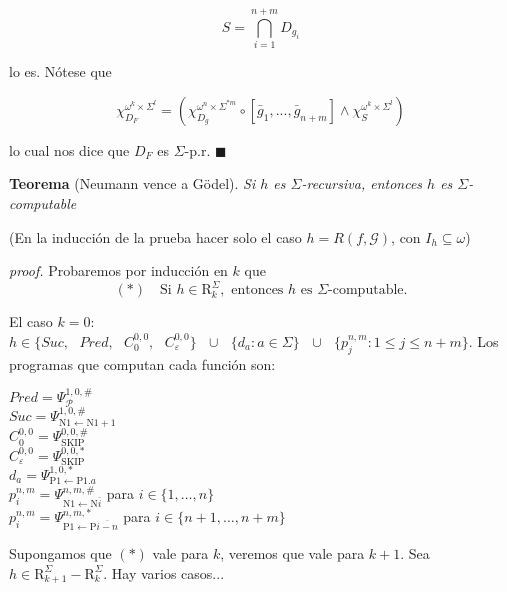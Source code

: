 \documentclass{article}
\begin{document}
\[
S = \bigcap_{i=1}^{n+m} D_{g_i}
\]

lo es. Nótese que

\[
\chi_{D_F}^{\omega^k \times \Sigma^l} = \left( \chi_{D_g}^{\omega^n \times \Sigma^{*m}} \circ [\bar{g}_1, ..., \bar{g}_{n+m}]  \land \chi_S^{\omega^k \times \Sigma^l}\right)
\]

lo cual nos dice que $D_F$ es $\Sigma$-p.r. \hfill $\blacksquare$

\bigskip

\textbf{Teorema} (Neumann vence a Gödel). \textit{Si $h$ es $\Sigma$-recursiva, entonces $h$ es $\Sigma$-computable}

\medskip

(En la inducción de la prueba hacer solo el caso $h = R(f, \mathcal{G})$, con $I_h \subseteq \omega$)
\medskip

\textit{proof.}
Probaremos por inducción en $k$ que
\[
(*) \quad \text{Si } h \in \text{R}_k^{\Sigma}, \text{ entonces } h \text{ es } \Sigma\text{-computable}.
\]

El caso $k = 0$: $h \in \{Suc, \text{ } Pred, \text{ } C_0^{0,0}, \text{ } C_{\varepsilon}^{0,0}\} \text{ } \cup \text{ } \{d_a : a \in \Sigma\} \text{ } \cup \text{ } \{p_j^{n,m} : 1 \leq j \leq n + m\}$. 
Los programas que computan cada función son:
\begin{center}
        $Pred = \Psi_{\mathcal{P}}^{1, 0, \#}$\\
        \medskip
        $Suc = \Psi_{\text{N1}\leftarrow\text{N1}+1}^{1,0,\#}$\\
        \medskip
        $C_0^{0,0} = \Psi_{\text{SKIP}}^{0,0,\#}$\\
        \medskip
        $C_{\varepsilon}^{0,0} = \Psi_{\text{SKIP}}^{0,0,*}$\\
        \medskip
        $d_a = \Psi_{\text{P1}\leftarrow\text{P1}.a}^{1,0,*}$\\
        \medskip
        $p_i^{n,m} = \Psi_{\text{N1}\leftarrow\text{N}\bar{i}}^{n, m, \#}$ para $i \in \{1, \dots, n\}$\\
        \medskip
        $p_i^{n,m} = \Psi_{\text{P1}\leftarrow\text{P}\overline{i - n}}^{n, m, *}$ para $i \in \{n + 1, \dots, n + m\}$\\
  

\end{center}

Supongamos que $(*)$ vale para $k$, veremos que vale para $k + 1$. Sea $h \in \text{R}_{k+1}^{\Sigma} - \text{R}_k^{\Sigma}$. Hay varios casos...
\end{document}
